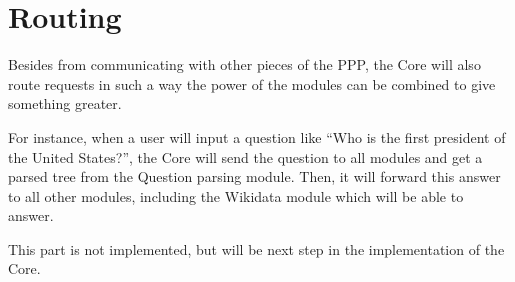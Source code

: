 \section{Routing}

Besides from communicating with other pieces of the PPP, the Core will
also route requests in such a way the power of the modules can be
combined to give something greater.

For instance, when a user will input a question like “Who is the first
president of the United States?”, the Core will send the question to
all modules and get a parsed tree from the Question parsing module. Then, it will forward this answer to all other modules,
including the Wikidata module which will be able to answer.

This part is not implemented, but will be next step in the implementation
of the Core.
